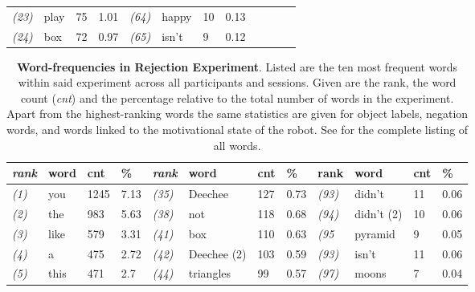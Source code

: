 \begin{screenonly}
\begin{table*}[h]
\begin{tabular*}{\hsize}{@{\extracolsep{\fill}}llllllllllll}
    \textsl{(23)} & play & 75 & 1.01 & \hspace*{2ex}\textsl{(64)} & happy & 10 & 0.13 & & & & \\
    \textsl{(24)} & box & 72 & 0.97 & \hspace*{2ex}\textsl{(65)} & isn't & 9 & 0.12 & & & & \\
    \bottomrule
  \end{tabular*}
\end{table*}
\begin{table*}[h]
\caption{\textbf{Word-frequencies in Rejection Experiment}. Listed are the ten most frequent words
    within said experiment across all participants and sessions. Given are the rank, the word count (\emph{cnt}) and the
    percentage relative to the total number of words in the experiment. Apart from the highest-ranking words the same
    statistics are given for object labels, negation words, and words linked to the motivational state of the robot.
    See \cite{Foerster2013} for the complete listing of all words.}
  \label{tbl_wf_r}
  \begin{tabular*}{\hsize}{@{\extracolsep{\fill}}llllllllllll}
    \textsl{rank} & word & cnt & \% & \hspace*{2ex}\textsl{rank} & word & cnt & \% & \hspace*{2ex}rank & word & cnt & \%\\
    \toprule
    \textsl{(1)} & you & 1245 & 7.13 & \hspace*{2ex}\textsl{(35)} & Deechee & 127 & 0.73 & \hspace*{2ex}\textsl{(93)} & didn't & 11 & 0.06\\
    \textsl{(2)} & the & 983 & 5.63 & \hspace*{2ex}\textsl{(38)} & not & 118 & 0.68 & \hspace*{2ex}\textsl{(94)} & didn't (2) & 10 & 0.06\\
    \textsl{(3)} & like & 579 & 3.31 & \hspace*{2ex}\textsl{(41)} & box & 110 & 0.63 & \hspace*{2ex}\textsl{(95} & pyramid & 9 & 0.05\\
    \textsl{(4)} & a & 475 & 2.72 & \hspace*{2ex}\textsl{(42)} & Deechee (2) & 103 & 0.59 & \hspace*{2ex}\textsl{(93)} & isn't & 11 & 0.06\\
    \textsl{(5)} & this & 471 & 2.7 & \hspace*{2ex}\textsl{(44)} & triangles & 99 & 0.57 & \hspace*{2ex}\textsl{(97)} & moons & 7 & 0.04\\

\end{tabular*}
\end{table*}
\end{screenonly}
